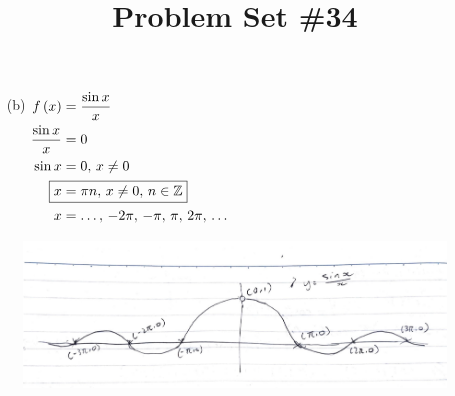 \documentclass{article}
\begin{document}
\begin{multicols}{2}
\begin{itemize}
	\item[(b)]
	$\begin{aligned}[t]
		f\left(x\right)&=\frac{\sin x}{x} \\
		\frac{\sin x}{x}&=0 \\
		\sin x&=0,\,x\neq0 \\
		\Aboxed{x&=\pi n,\,x\neq0,\,n\in\mathbb{Z}} \\
		x&=\hdots,\,-2\pi,\,-\pi,\,\pi,\,2\pi,\,\hdots \\
	\end{aligned}$
\end{itemize}
\end{multicols}

\begin{figure}[h]
	\centering
	\includegraphics[width=\textwidth]{ps34q3b.png}
\end{figure}

\pagebreak
\title{Problem Set \#34}
\maketitle
\end{document}
